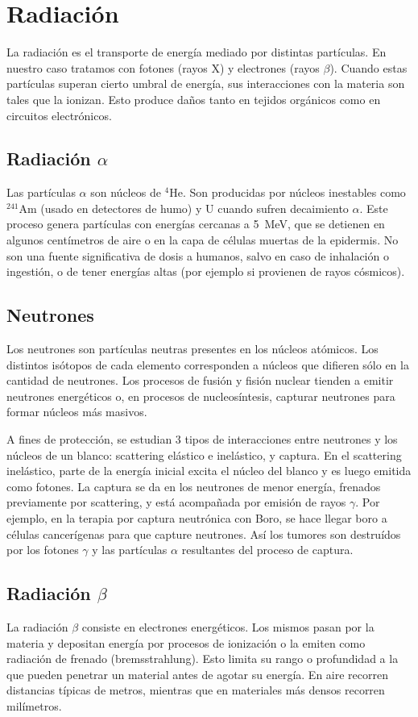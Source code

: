 \section{Radiación}
\label{sec:radiacion}
La radiación es el transporte de energía mediado por distintas partículas.
En nuestro caso tratamos con fotones (rayos X) y electrones (rayos $\beta$).
Cuando estas partículas superan cierto umbral de energía, 
sus interacciones con la materia son tales que la ionizan.
Esto produce daños tanto en tejidos orgánicos como en circuitos electrónicos.
%
\subsection{Radiación $\alpha$}
Las partículas $\alpha$ son núcleos de $^4$He.
Son producidas por núcleos inestables como
$^{241}$Am (usado en detectores de humo) y U 
cuando sufren decaimiento $\alpha$.
Este proceso genera partículas con energías cercanas a 
\SI{5}{\mega\electronvolt},
que se detienen en algunos centímetros de aire 
o en la capa de células muertas de la epidermis.
No son una fuente significativa de dosis a humanos,
salvo en caso de inhalación o ingestión,
o de tener energías altas
(por ejemplo si provienen de rayos cósmicos).
\subsection{Neutrones}
Los neutrones son partículas neutras presentes en los núcleos atómicos.
Los distintos isótopos de cada elemento corresponden a núcleos que difieren
sólo en la cantidad de neutrones.
Los procesos de fusión y fisión nuclear 
tienden a emitir neutrones energéticos o,
en procesos de nucleosíntesis,
capturar neutrones para formar núcleos más masivos.

A fines de protección, se estudian 3 tipos de interacciones entre neutrones
y los núcleos de un blanco:
scattering elástico e inelástico, y captura.
En el scattering inelástico,
parte de la energía inicial excita el núcleo del blanco y es luego emitida como
fotones.
La captura se da en los neutrones de menor energía,
frenados previamente por scattering,
y está acompañada por emisión de rayos $\gamma$.
Por ejemplo, en la terapia por captura neutrónica con Boro,
se hace llegar boro a células cancerígenas para que capture neutrones.
Así los tumores son destruídos por los fotones $\gamma$ y las partículas 
$\alpha$ resultantes del proceso de captura.
\subsection{Radiación $\beta$}
La radiación $\beta$ consiste en electrones energéticos.
Los mismos pasan por la materia y depositan energía por procesos de ionización 
o la emiten como radiación de frenado (bremsstrahlung).
Esto limita su rango o profundidad a la que pueden penetrar un material antes
de agotar su energía.
En aire recorren distancias típicas de metros, 
mientras que en materiales más densos recorren milímetros.

